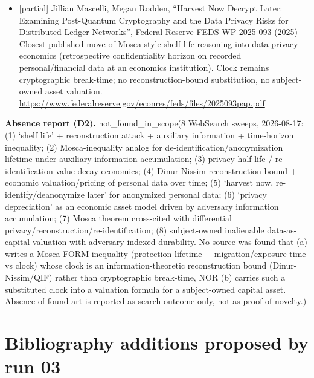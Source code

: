 \documentclass[
  11pt,
]{article}
\begin{document}
\begin{itemize}
  {[}partial{]} Meng Zhang, Ermin Wei, Randall Berry, Jianwei Huang,
  ``Age-Dependent Differential Privacy'', IEEE Trans. Information Theory
  / arXiv:2209.01466 (2022) --- A formally time-indexed
  information-theoretic privacy quantity (privacy risk as a function of
  data age) --- the same mathematical object class as the substituted
  clock, applied to utility trade-offs rather than asset valuation and
  without a Mosca-form inequality.
  \url{https://arxiv.org/abs/2209.01466}
\item
  {[}partial{]} Jillian Mascelli, Megan Rodden, ``Harvest Now Decrypt
  Later: Examining Post-Quantum Cryptography and the Data Privacy Risks
  for Distributed Ledger Networks'', Federal Reserve FEDS WP 2025-093
  (2025) --- Closest published move of Mosca-style shelf-life reasoning
  into data-privacy economics (retrospective confidentiality horizon on
  recorded personal/financial data at an economics institution). Clock
  remains cryptographic break-time; no reconstruction-bound
  substitution, no subject-owned asset valuation.
  \url{https://www.federalreserve.gov/econres/feds/files/2025093pap.pdf}
\end{itemize}

\textbf{Absence report (D2).} not\_found\_in\_scope(8 WebSearch sweeps,
2026-08-17: (1) `shelf life' + reconstruction attack + auxiliary
information + time-horizon inequality; (2) Mosca-inequality analog for
de-identification/anonymization lifetime under auxiliary-information
accumulation; (3) privacy half-life / re-identification value-decay
economics; (4) Dinur-Nissim reconstruction bound + economic
valuation/pricing of personal data over time; (5) `harvest now,
re-identify/deanonymize later' for anonymized personal data; (6)
`privacy depreciation' as an economic asset model driven by adversary
information accumulation; (7) Mosca theorem cross-cited with
differential privacy/reconstruction/re-identification; (8) subject-owned
inalienable data-as-capital valuation with adversary-indexed durability.
No source was found that (a) writes a Mosca-FORM inequality
(protection-lifetime + migration/exposure time vs clock) whose clock is
an information-theoretic reconstruction bound (Dinur-Nissim/QIF) rather
than cryptographic break-time, NOR (b) carries such a substituted clock
into a valuation formula for a subject-owned capital asset. Absence of
found art is reported as search outcome only, not as proof of novelty.)

\newpage

\section{Bibliography additions proposed by run
03}\label{bibliography-additions-proposed-by-run-03}
\end{document}
